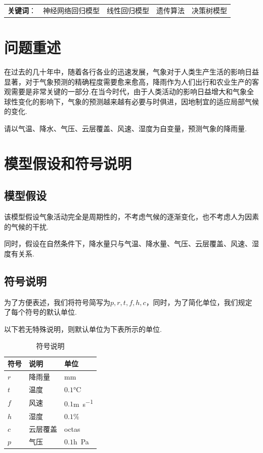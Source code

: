 \documentclass[UTF8, a4paper]{ctexart}
\begin{document}
\null\vfill %
\begin{flushleft}
	\begin{tabular}{
		>{\centering}p{}
		>{\centering}p{}
		>{\centering}p{}
		>{\centering}p{}
		>{\centering}p{}}
		\textbf{关键词}： & 神经网络回归模型 & 线性回归模型 & 遗传算法 & 决策树模型
	\end{tabular}
\end{flushleft}

\newpage

\section{问题重述}

在过去的几十年中，随着各行各业的迅速发展，气象对于人类生产生活的影响日益
显著，对于气象预测的精确程度需要愈来愈高，降雨作为人们出行和农业生产的客
观需要是非常关键的一部分.在当今时代，由于人类活动的影响日益增大和气象全
球性变化的影响下，气象的预测越来越有必要与时俱进，因地制宜的适应局部气候的变化.

请以气温、降水、气压、云层覆盖、风速、湿度为自变量，预测气象的降雨量.

\section{模型假设和符号说明}

\subsection{模型假设}
该模型假设气象活动完全是周期性的，不考虑气候的逐渐变化，也不考虑人为因素的气候的干扰.

同时，假设在自然条件下，降水量只与气温、降水量、气压、云层覆盖、风速、湿度有关系.

\subsection{符号说明}

为了方便表述，我们将符号简写为$p,r,t,f,h,c$，同时，为了简化单位，我们规定了每个符号的默认单位.

以下若无特殊说明，则默认单位为下表所示的单位.

\begin{table}[h!]
	\centering
	\caption{符号说明}
	\begin{tabular}{p{6em}p{6em}l}
		\hline
		符号  & 说明   & 单位                          \\
		\hline
		$r$ & 降雨量  & \si{\milli\meter}           \\
		$t$ & 温度   & $0.1$\si{\degreeCelsius}    \\
		$f$ & 风速   & $0.1$\si{\meter\per\second} \\
		$h$ & 湿度   & $0.1\%$                     \\
		$c$ & 云层覆盖 & \si{octas}                  \\
		$p$ & 气压   & $0.1$\si{h\pascal}          \\
		\hline
	\end{tabular}
\end{table}
\end{document}

